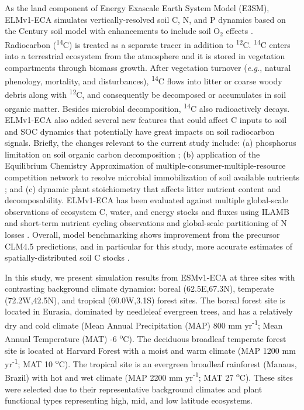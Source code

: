 \documentclass[11pt,a4paper]{article}
\begin{document}
    As the land component of Energy Exascale Earth System Model (E3SM), ELMv1-ECA \citep{Zhu2019} simulates vertically-resolved soil C, N, and P dynamics based on the Century soil model \citep{Parton1993} with enhancements  to include soil O$_2$ effects \citep{Koven2013}. Radiocarbon (\textsuperscript{14}C) is treated as a separate tracer in addition to \textsuperscript{12}C. \textsuperscript{14}C enters into a terrestrial ecosystem from the atmosphere \citep{Graven2017} and it is stored in vegetation compartments through biomass growth. After vegetation turnover (\textit{e.g.}, natural phenology, mortality, and disturbances), \textsuperscript{14}C flows into litter or coarse woody debris  along with \textsuperscript{12}C, and consequently be decomposed or accumulates in soil organic matter. Besides microbial decomposition, \textsuperscript{14}C also radioactively decays. ELMv1-ECA also added several new features that could affect C inputs to soil and SOC dynamics that potentially have great impacts on soil radiocarbon signals. Briefly, the changes relevant to the current study include: (a) phosphorus limitation on soil organic carbon decomposition \citep{zhu2016bg}; (b) application of the Equilibrium Chemistry Approximation of multiple-consumer-multiple-resource competition network to resolve microbial immobilization of soil available nutrients \citep{Tang2013, Zhu2017ea}; and (c) dynamic plant stoichiometry that affects litter nutrient content and decomposability. ELMv1-ECA has been evaluated against multiple global-scale observations of ecosystem C, water, and energy stocks and fluxes using ILAMB \citep{Collier2018, Zhu2019} and short-term nutrient cycling observations and global-scale partitioning of N losses \citep{Zhu2015ncc, Riley2018}. Overall, model benchmarking shows improvement from the precursor CLM4.5 predictions, and in particular for this study, more accurate estimates of spatially-distributed soil C stocks \citep{Zhu2019}.
    
  In this study, we present simulation results from ESMv1-ECA at three sites with contrasting background climate dynamics: boreal (62.5E,67.3N), temperate  (72.2W,42.5N), and tropical (60.0W,3.1S) forest sites. The boreal forest site is located in Eurasia, dominated by needleleaf evergreen trees, and has  a relatively dry and cold climate (Mean Annual Precipitation (MAP) 800 mm yr\textsuperscript{-1}; Mean Annual Temperature (MAT) -6 \textsuperscript{o}C). The deciduous broadleaf temperate forest site is located at Harvard Forest with a moist and warm climate (MAP 1200 mm yr\textsuperscript{-1}; MAT 10 \textsuperscript{o}C). The tropical site is an evergreen broadleaf rainforest (Manaus, Brazil) with hot and wet climate (MAP 2200 mm yr\textsuperscript{-1}; MAT 27 \textsuperscript{o}C). These sites were selected due to their representative background climates and plant functional types representing high, mid, and low latitude ecosystems.
    
\end{document}
